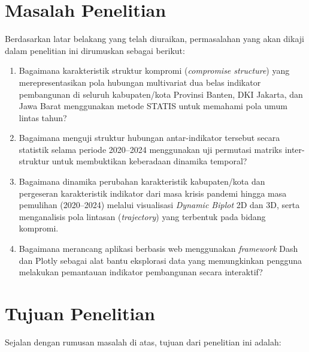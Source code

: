 \documentclass[a4paper]{article}
\theoremstyle{definition} %
\begin{document}
\section{Masalah Penelitian}

Berdasarkan latar belakang yang telah diuraikan, permasalahan yang akan dikaji dalam penelitian ini dirumuskan sebagai berikut:

\begin{enumerate}
    \item Bagaimana karakteristik struktur kompromi (\textit{compromise structure}) yang merepresentasikan pola hubungan multivariat dua belas indikator pembangunan di seluruh kabupaten/kota Provinsi Banten, DKI Jakarta, dan Jawa Barat menggunakan metode STATIS untuk memahami pola umum lintas tahun?
    \item Bagaimana menguji struktur hubungan antar-indikator tersebut secara statistik selama periode 2020--2024 menggunakan uji permutasi matriks inter-struktur untuk membuktikan keberadaan dinamika temporal?
    \item Bagaimana dinamika perubahan karakteristik kabupaten/kota dan pergeseran karakteristik indikator dari masa krisis pandemi hingga masa pemulihan (2020--2024) melalui visualisasi \textit{Dynamic Biplot} 2D dan 3D, serta menganalisis pola lintasan (\textit{trajectory}) yang terbentuk pada bidang kompromi.
    \item Bagaimana merancang aplikasi berbasis web menggunakan \textit{framework} Dash dan Plotly sebagai alat bantu eksplorasi data yang memungkinkan pengguna melakukan pemantauan indikator pembangunan secara interaktif?
\end{enumerate}

\section{Tujuan Penelitian}

Sejalan dengan rumusan masalah di atas, tujuan dari penelitian ini adalah:
\end{document}
